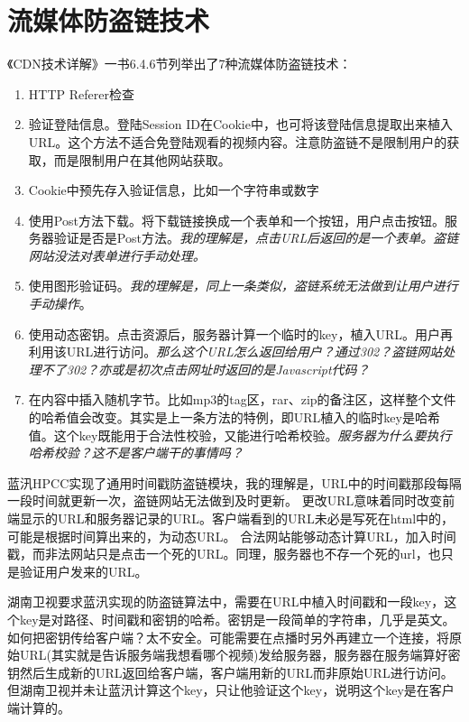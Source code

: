 \section{流媒体防盗链技术}

《CDN技术详解》一书6.4.6节列举出了7种流媒体防盗链技术：

\begin{enumerate}
\item HTTP Referer检查
\item 验证登陆信息。登陆Session ID在Cookie中，也可将该登陆信息提取出来植入URL。这个方法不适合免登陆观看的视频内容。注意防盗链不是限制用户的获取，而是限制用户在其他网站获取。
\item Cookie中预先存入验证信息，比如一个字符串或数字
\item 使用Post方法下载。将下载链接换成一个表单和一个按钮，用户点击按钮。服务器验证是否是Post方法。\textit{我的理解是，点击URL后返回的是一个表单。盗链网站没法对表单进行手动处理。}
\item 使用图形验证码。\textit{我的理解是，同上一条类似，盗链系统无法做到让用户进行手动操作}。
\item 使用动态密钥。点击资源后，服务器计算一个临时的key，植入URL。用户再利用该URL进行访问。\textit{那么这个URL怎么返回给用户？通过302？盗链网站处理不了302？亦或是初次点击网址时返回的是Javascript代码？}
\item 在内容中插入随机字节。比如mp3的tag区，rar、zip的备注区，这样整个文件的哈希值会改变。其实是上一条方法的特例，即URL植入的临时key是哈希值。这个key既能用于合法性校验，又能进行哈希校验。\textit{服务器为什么要执行哈希校验？这不是客户端干的事情吗？}
\end{enumerate}


蓝汛HPCC实现了通用时间戳防盗链模块，我的理解是，URL中的时间戳那段每隔一段时间就更新一次，盗链网站无法做到及时更新。
更改URL意味着同时改变前端显示的URL和服务器记录的URL。客户端看到的URL未必是写死在html中的，可能是根据时间算出来的，为动态URL。
合法网站能够动态计算URL，加入时间戳，而非法网站只是点击一个死的URL。同理，服务器也不存一个死的url，也只是验证用户发来的URL。

湖南卫视要求蓝汛实现的防盗链算法中，需要在URL中植入时间戳和一段key，这个key是对路径、时间戳和密钥的哈希。密钥是一段简单的字符串，几乎是英文。如何把密钥传给客户端？太不安全。可能需要在点播时另外再建立一个连接，将原始URL(其实就是告诉服务端我想看哪个视频)发给服务器，服务器在服务端算好密钥然后生成新的URL返回给客户端，客户端用新的URL而非原始URL进行访问。但湖南卫视并未让蓝汛计算这个key，只让他验证这个key，说明这个key是在客户端计算的。



